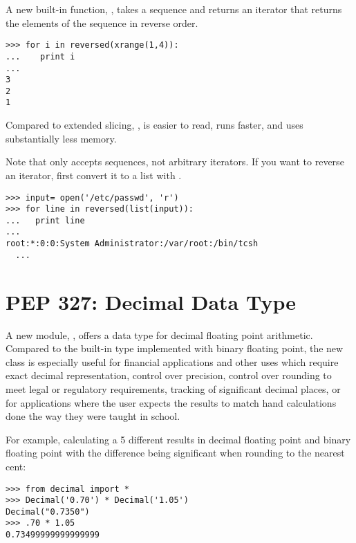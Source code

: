 \documentclass{howto}
\begin{document}
A new built-in function, , takes a sequence
and returns an iterator that returns the elements of the sequence 
in reverse order.  

\begin{verbatim}
>>> for i in reversed(xrange(1,4)):
...    print i
... 
3
2
1
\end{verbatim}

Compared to extended slicing, , 
is easier to read, runs faster, and uses substantially less memory.

Note that  only accepts sequences, not arbitrary
iterators.  If you want to reverse an iterator, first convert it to 
a list with .

\begin{verbatim}
>>> input= open('/etc/passwd', 'r')
>>> for line in reversed(list(input)):
...   print line
... 
root:*:0:0:System Administrator:/var/root:/bin/tcsh
  ...
\end{verbatim}

\begin{seealso}

\end{seealso}


\section{PEP 327: Decimal Data Type}

A new module, , offers a  data type for
decimal floating point arithmetic.  Compared to the built-in 
type implemented with binary floating point, the new class is especially
useful for financial applications and other uses which require exact
decimal representation, control over precision, control over rounding
to meet legal or regulatory requirements, tracking of significant
decimal places, or for applications where the user expects the results
to match hand calculations done the way they were taught in school.

For example, calculating a 5%
different results in decimal floating point and binary floating point
with the difference being significant when rounding to the nearest
cent:

\begin{verbatim}
>>> from decimal import *       
>>> Decimal('0.70') * Decimal('1.05')
Decimal("0.7350")
>>> .70 * 1.05
0.73499999999999999       
\end{verbatim}
\end{document}
